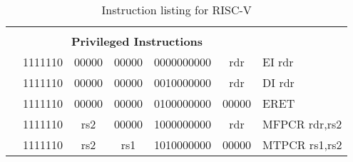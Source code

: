 \begin{table}[p]
\begin{small}
\begin{center}
\begin{tabular}{rcccccccccl}
&
\multicolumn{9}{c}{} & \\
&
\multicolumn{9}{c}{\bf Privileged Instructions} & \\
\cline{2-10}
  

&
\multicolumn{2}{|c|}{1111110} &
\multicolumn{1}{c|}{00000} &
\multicolumn{1}{c|}{00000} &
\multicolumn{4}{c|}{0000000000} &
\multicolumn{1}{c|}{rdr} & EI rdr \\
\cline{2-10}
  

&
\multicolumn{2}{|c|}{1111110} &
\multicolumn{1}{c|}{00000} &
\multicolumn{1}{c|}{00000} &
\multicolumn{4}{c|}{0010000000} &
\multicolumn{1}{c|}{rdr} & DI rdr \\
\cline{2-10}
  

&
\multicolumn{2}{|c|}{1111110} &
\multicolumn{1}{c|}{00000} &
\multicolumn{1}{c|}{00000} &
\multicolumn{4}{c|}{0100000000} &
\multicolumn{1}{c|}{00000} & ERET  \\
\cline{2-10}
  

&
\multicolumn{2}{|c|}{1111110} &
\multicolumn{1}{c|}{rs2} &
\multicolumn{1}{c|}{00000} &
\multicolumn{4}{c|}{1000000000} &
\multicolumn{1}{c|}{rdr} & MFPCR rdr,rs2 \\
\cline{2-10}
  

&
\multicolumn{2}{|c|}{1111110} &
\multicolumn{1}{c|}{rs2} &
\multicolumn{1}{c|}{rs1} &
\multicolumn{4}{c|}{1010000000} &
\multicolumn{1}{c|}{00000} & MTPCR rs1,rs2 \\
\cline{2-10}
  

\end{tabular}
\end{center}
\end{small}
\caption{Instruction listing for RISC-V}
\label{instr-table}
\end{table}
  
